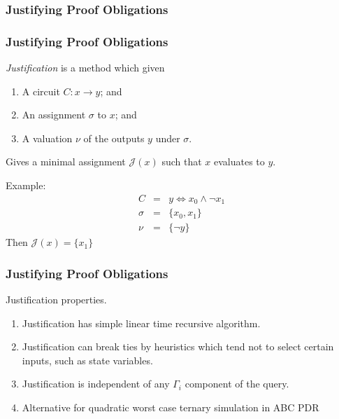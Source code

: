 \documentclass{beamer}
\begin{document}
\subsubsection{Justifying Proof Obligations}
\begin{frame}
	\frametitle{Justifying Proof Obligations}
	{\em Justification} is a method which given
	\begin{enumerate}
		\item A circuit $C: x \to y$; and
		\item An assignment $\sigma$ to $x$; and
		\item A valuation $\nu$ of the outputs $y$ under $\sigma$.
	\end{enumerate}
	Gives a minimal assignment $\mathcal{J}(x)$ such that $x$ evaluates to $y$.

	Example:
	\begin{align*}
		C & = & y \iff x_0 \wedge \neg x_1\\
		\sigma & = & \{ x_0, x_1 \}\\
		\nu & = & \{ \neg y \}
	\end{align*}
	Then $\mathcal{J}(x) = \{ x_1 \}$

\end{frame}

\begin{frame}
	\frametitle{Justifying Proof Obligations}
	Justification properties.
	\begin{enumerate}
		\item Justification has simple linear time recursive algorithm.
		\item Justification can break ties by heuristics which tend not
			to select certain inputs, such as state variables.
		\item Justification is independent of any $\Gamma_i$ component
			of the query. 
		\item Alternative for quadratic worst case ternary simulation in
			ABC PDR
	\end{enumerate}
\end{frame}
\end{document}
